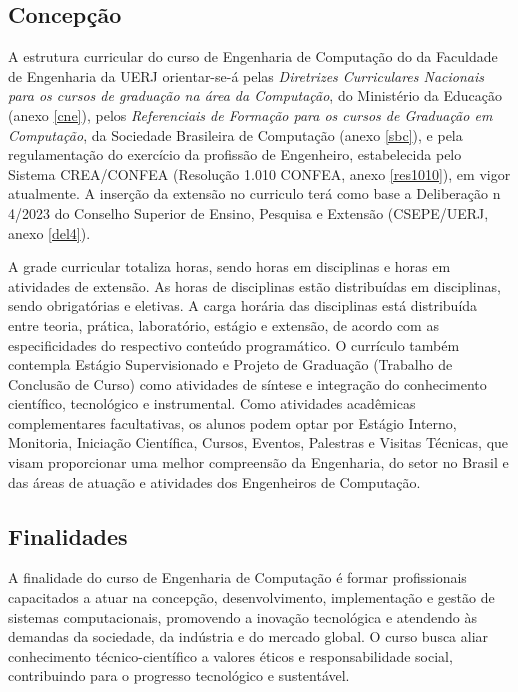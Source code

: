 \subsection{Concepção}

A estrutura curricular do curso de Engenharia de Computação do \desc da Faculdade de Engenharia da UERJ orientar-se-á pelas \textit{Diretrizes Curriculares Nacionais para os cursos de graduação na área da Computação}, do Ministério da Educação (anexo \ref{cne}), pelos \textit{Referenciais de Formação para os cursos de Graduação em Computação}, da Sociedade Brasileira de Computação (anexo \ref{sbc}), e pela regulamentação do exercício da profissão de Engenheiro, estabelecida pelo Sistema CREA/CONFEA (Resolução 1.010 CONFEA, anexo \ref{res1010}), em vigor atualmente. A inserção da extensão no curriculo terá como base a Deliberação n\textordmasculine{} 4/2023 do Conselho Superior de Ensino, Pesquisa e Extensão (CSEPE/UERJ, anexo \ref{del4}).

A grade curricular totaliza \totalhoras horas, sendo \hobrigatorias horas em disciplinas e \hextensao horas em atividades de extensão. As \hobrigatorias horas de disciplinas estão distribuídas em \ndisciplinas disciplinas, sendo \nobrigatorias  obrigatórias e \neletivas eletivas. A carga horária das disciplinas está distribuída entre teoria, prática, laboratório, estágio e extensão, de acordo com as especificidades do respectivo conteúdo programático. O currículo também contempla Estágio Supervisionado e Projeto de Graduação (Trabalho de Conclusão de Curso) como atividades de síntese e integração do conhecimento científico, tecnológico e instrumental. Como atividades acadêmicas complementares facultativas, os alunos podem optar por Estágio Interno, Monitoria, Iniciação Científica, Cursos, Eventos, Palestras e Visitas Técnicas, que visam proporcionar uma melhor compreensão da Engenharia, do setor no Brasil e das áreas de atuação e atividades dos Engenheiros de Computação.

\subsection{Finalidades}

A finalidade do curso de Engenharia de Computação é formar profissionais capacitados a atuar na concepção, desenvolvimento, implementação e gestão de sistemas computacionais, promovendo a inovação tecnológica e atendendo às demandas da sociedade, da indústria e do mercado global. O curso busca aliar conhecimento técnico-científico a valores éticos e responsabilidade social, contribuindo para o progresso tecnológico e sustentável.


